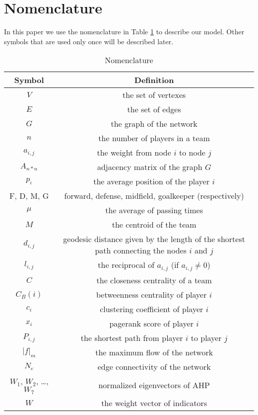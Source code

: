 \documentclass[12pt]{mcmthesis}
\begin{document}
\section{Nomenclature}
	In this paper we use the nomenclature in Table \ref{tab:Nomen} to describe our model. Other symbols that are used only once will be described later.
	\renewcommand\arraystretch{2}
	\begin{table}[h]
		\centering
		\caption{Nomenclature}
		\label{tab:Nomen}
		\begin{tabular}{c c}
			\hline
			\textbf{Symbol} & \textbf{Definition}\\
			\hline
			$V$ & the set of vertexes\\
			$E$ & the set of edges\\
			$G$ & the graph of the network\\
		 	$n$ & the number of players in a team\\
		 	$a_{i, j}$ & the weight from node $i$ to node $j$\\
		 	$A_{n*n}$ & adjacency matrix of the graph $G$\\
		 	$p_{i}$ & the average position of the player $i$\\
		 	F, D, M, G & forward, defense, midfield, goalkeeper (respectively)\\
		 	$\mu$ & the average of passing times\\
		 	$M$ & the centroid of the team\\
		 	$d_{i ,j}$ & geodesic distance given by the length of the shortest path connecting the nodes $i$ and $j$\\
		 	$l_{i, j}$ & the reciprocal of $a_{i, j}$ (if $a_{i, j} \neq 0$)\\
		 	$C$ & the closeness centrality of a team\\
		 	$C_B (i)$ & betweenness centrality of player $i$\\
		 	$c_i$ & clustering coefficient of player $i$\\
		 	$x_i$ & pagerank score of player $i$\\
		 	$P_{i, j}$ & the shortest path from player $i$ to player $j$\\
		 	$|f|_m$ & the maximum flow of the network\\
		 	$N_e$ & edge connectivity of the network\\
		 	$W_1$, $W_2$, \ldots, $W_7$ & normalized eigenvectors of AHP\\ 
		 	$W$ & the weight vector of indicators\\
			\hline
		\end{tabular}
	\end{table}
\end{document}
